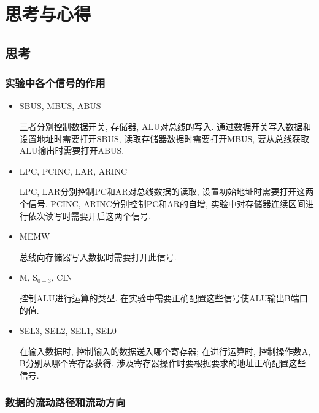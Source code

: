\documentclass[../main.tex]{subfiles}
\begin{document}
\section{思考与心得}

\subsection{思考}

\subsubsection{实验中各个信号的作用}

\begin{itemize}

    \item SBUS, MBUS, ABUS

          三者分别控制数据开关, 存储器, ALU对总线的写入.
          通过数据开关写入数据和设置地址时需要打开SBUS,
          读取存储器数据时需要打开MBUS,
          要从总线获取ALU输出时需要打开ABUS.

    \item LPC, PCINC, LAR, ARINC

          LPC, LAR分别控制PC和AR对总线数据的读取, 设置初始地址时需要打开这两个信号.
          PCINC, ARINC分别控制PC和AR的自增, 实验中对存储器连续区间进行依次读写时需要开启这两个信号.

    \item MEMW

          总线向存储器写入数据时需要打开此信号.

    \item M, S$_{0-3}$, CIN

          控制ALU进行运算的类型. 在实验中需要正确配置这些信号使ALU输出B端口的值.

    \item SEL3, SEL2, SEL1, SEL0

          在输入数据时, 控制输入的数据送入哪个寄存器; 在进行运算时, 控制操作数A, B分别从哪个寄存器获得.
          涉及寄存器操作时要根据要求的地址正确配置这些信号.

\end{itemize}

\subsubsection{数据的流动路径和流动方向}
\end{document}
